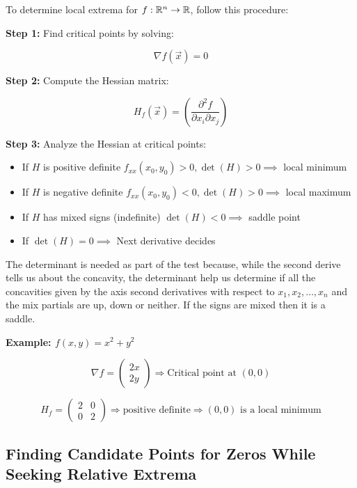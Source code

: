 To determine local extrema for \( f : \mathbb{R}^n \to \mathbb{R} \), follow this procedure:

\textbf{Step 1:} Find critical points by solving:

\[
    \nabla f(\vec{x}) = 0
\]

\textbf{Step 2:} Compute the Hessian matrix:

\[
    H_f(\vec{x}) = \left( \frac{\partial^2 f}{\partial x_i \partial x_j} \right)
\]

\textbf{Step 3:} Analyze the Hessian at critical points:

\begin{itemize}

    \item If \( H \) is positive definite \(f_{xx}(x_0, y_0) > 0, \det(H) > 0 \implies\) local minimum

    \item If \( H \) is negative definite \(f_{xx}(x_0, y_0) < 0, \det(H) > 0 \implies\) local maximum

    \item If \( H \) has mixed signs (indefinite) \(\det(H) < 0 \implies  \) saddle point

    \item If \(\det(H) = 0 \implies \) Next derivative decides

\end{itemize}

The determinant is needed as part of the test because, while the second derive tells us about the concavity, the 
determinant help us determine if all the concavities given by the axis second derivatives with respect to 
\(x_1, x_2, \dots, x_n\) and the mix partials are up, down or neither. If the signs are mixed then it is a saddle.  

\textbf{Example: \( f(x, y) = x^2 + y^2 \)}

\[
    \nabla f = \begin{pmatrix} 2x \\ 2y \end{pmatrix} \Rightarrow \text{Critical point at } (0, 0)
\]

\[
    H_f = \begin{pmatrix} 2 & 0 \\ 0 & 2 \end{pmatrix} \Rightarrow \text{positive definite}
    \Rightarrow (0, 0) \text{ is a local minimum}
\]

\subsection{Finding Candidate Points for Zeros While Seeking Relative Extrema}


